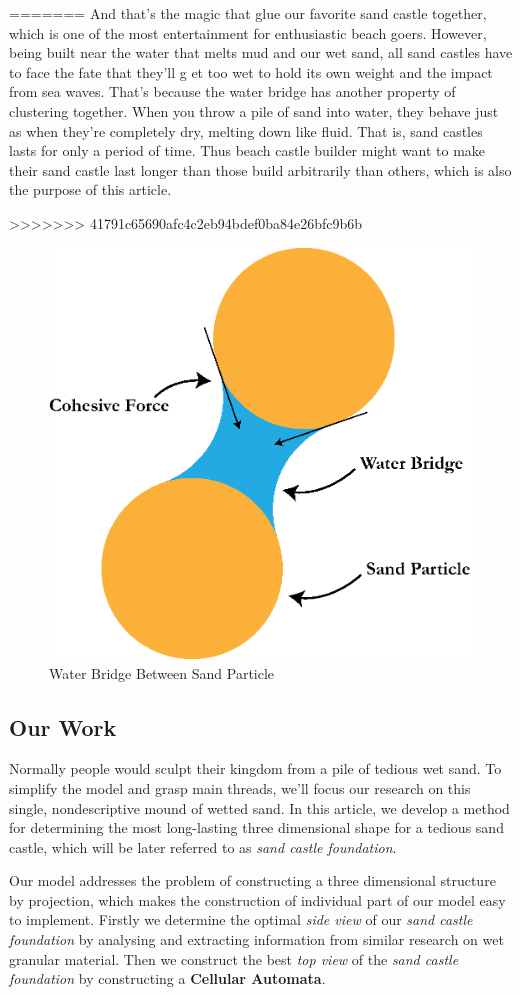 \documentclass[12pt]{article}
\begin{document}
=======
And that's the magic that glue our favorite sand castle together, which is one of the most entertainment for enthusiastic beach goers. However, being built near the water that melts mud and our wet sand, all sand castles have to face the fate that they'll g et too wet to hold its own weight and the impact from sea waves. That's because the water bridge has another property of clustering together\autocite{kudrolli2008sticky}. When you throw a pile of sand into water, they behave just as when they're completely dry, melting down like fluid. That is, sand castles lasts for only a period of time. Thus beach castle builder might want to make their sand castle last longer than those build arbitrarily than others, which is also the purpose of this article.

>>>>>>> 41791c65690afc4c2eb94bdef0ba84e26bfc9b6b

\begin{figure}
    \centering
    \includegraphics[width=0.5\linewidth]{water_bridge.eps}
    \caption{Water Bridge Between Sand Particle}
    \label{fig:water_bridge}
\end{figure}

\subsection{Our Work}
Normally people would sculpt their kingdom from a pile of tedious wet sand. To simplify the model and grasp main threads, we'll focus our research on this single, nondescriptive mound of wetted sand. In this article, we develop a method for determining the most long-lasting three dimensional shape for a tedious sand castle, which will be later referred to as \textit{sand castle foundation}.
\par
Our model addresses the problem of constructing a three dimensional structure by projection, which makes the construction of individual part of our model easy to implement. Firstly we determine the optimal \textit{side view} of our \textit{sand castle foundation} by analysing and extracting information from similar research on wet granular material\autocite{mitarai2006wet}. Then we construct the best \textit{top view} of the \textit{sand castle foundation} by constructing a \textbf{Cellular Automata}.
\end{document}
